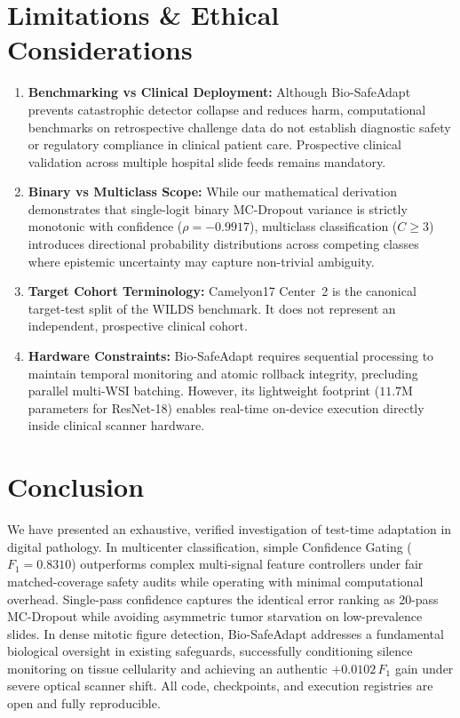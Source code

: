 \documentclass[conference]{IEEEtran}
\begin{document}
\section{Limitations \& Ethical Considerations}
\begin{enumerate}
    \item \textbf{Benchmarking vs Clinical Deployment:} Although Bio-SafeAdapt prevents catastrophic detector collapse and reduces harm, computational benchmarks on retrospective challenge data do not establish diagnostic safety or regulatory compliance in clinical patient care. Prospective clinical validation across multiple hospital slide feeds remains mandatory.
    \item \textbf{Binary vs Multiclass Scope:} While our mathematical derivation demonstrates that single-logit binary MC-Dropout variance is strictly monotonic with confidence ($\rho = -0.9917$), multiclass classification ($C \ge 3$) introduces directional probability distributions across competing classes where epistemic uncertainty may capture non-trivial ambiguity.
    \item \textbf{Target Cohort Terminology:} Camelyon17 Center~2 is the canonical target-test split of the WILDS benchmark. It does not represent an independent, prospective clinical cohort.
    \item \textbf{Hardware Constraints:} Bio-SafeAdapt requires sequential processing to maintain temporal monitoring and atomic rollback integrity, precluding parallel multi-WSI batching. However, its lightweight footprint ($11.7\text{M}$ parameters for ResNet-18) enables real-time on-device execution directly inside clinical scanner hardware.
\end{enumerate}

\section{Conclusion}
We have presented an exhaustive, verified investigation of test-time adaptation in digital pathology. In multicenter classification, simple Confidence Gating ($F_1 = 0.8310$) outperforms complex multi-signal feature controllers under fair matched-coverage safety audits while operating with minimal computational overhead. Single-pass confidence captures the identical error ranking as 20-pass MC-Dropout while avoiding asymmetric tumor starvation on low-prevalence slides. In dense mitotic figure detection, Bio-SafeAdapt addresses a fundamental biological oversight in existing safeguards, successfully conditioning silence monitoring on tissue cellularity and achieving an authentic $+0.0102$\,$F_1$ gain under severe optical scanner shift. All code, checkpoints, and execution registries are open and fully reproducible.
\end{document}
